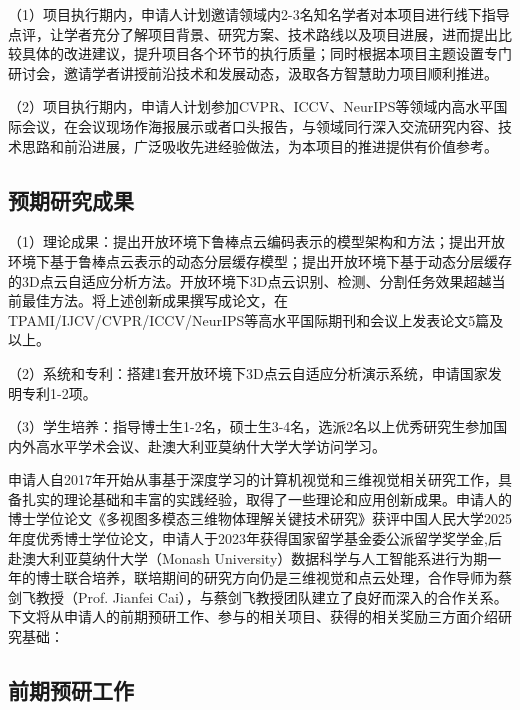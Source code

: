 \documentclass[12pt]{article}
\begin{document}
（1）项目执行期内，申请人计划邀请领域内2-3名知名学者对本项目进行线下指导点评，让学者充分了解项目背景、研究方案、技术路线以及项目进展，进而提出比较具体的改进建议，提升项目各个环节的执行质量；同时根据本项目主题设置专门研讨会，邀请学者讲授前沿技术和发展动态，汲取各方智慧助力项目顺利推进。

（2）项目执行期内，申请人计划参加CVPR、ICCV、NeurIPS等领域内高水平国际会议，在会议现场作海报展示或者口头报告，与领域同行深入交流研究内容、技术思路和前沿进展，广泛吸收先进经验做法，为本项目的推进提供有价值参考。

\subsection{预期研究成果}

（1）理论成果：提出开放环境下鲁棒点云编码表示的模型架构和方法；提出开放环境下基于鲁棒点云表示的动态分层缓存模型；提出开放环境下基于动态分层缓存的3D点云自适应分析方法。开放环境下3D点云识别、检测、分割任务效果超越当前最佳方法。将上述创新成果撰写成论文，在TPAMI/IJCV/CVPR/ICCV/NeurIPS等高水平国际期刊和会议上发表论文5篇及以上。

（2）系统和专利：搭建1套开放环境下3D点云自适应分析演示系统，申请国家发明专利1-2项。

（3）学生培养：指导博士生1-2名，硕士生3-4名，选派2名以上优秀研究生参加国内外高水平学术会议、赴澳大利亚莫纳什大学大学访问学习。





申请人自2017年开始从事基于深度学习的计算机视觉和三维视觉相关研究工作，具备扎实的理论基础和丰富的实践经验，取得了一些理论和应用创新成果。申请人的博士学位论文《多视图多模态三维物体理解关键技术研究》获评中国人民大学2025年度优秀博士学位论文，申请人于2023年获得国家留学基金委公派留学奖学金,后赴澳大利亚莫纳什大学（Monash University）数据科学与人工智能系进行为期一年的博士联合培养，联培期间的研究方向仍是三维视觉和点云处理，合作导师为蔡剑飞教授（Prof. Jianfei Cai），与蔡剑飞教授团队建立了良好而深入的合作关系。下文将从申请人的前期预研工作、参与的相关项目、获得的相关奖励三方面介绍研究基础：

\subsection{前期预研工作}
\end{document}

